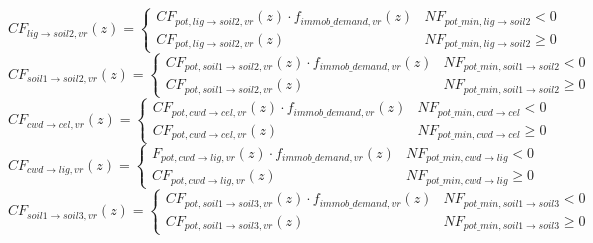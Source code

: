 \begin{equation}
    CF_{lig \rightarrow soil2, vr}(z)=\left\{\begin{array}{ll} CF_{pot, lig \rightarrow soil2, vr}(z) \cdot f_{immob\_demand, vr}(z) & NF_{pot\_{min, lig \rightarrow soil2}} <0 \\ 
    CF_{pot, lig \rightarrow soil2, vr}(z) & NF_{pot\_{min, lig \rightarrow soil2}} \geqslant 0
   \end{array}\right.
\end{equation}
\begin{equation}
    CF_{soil1 \rightarrow soil2, vr}(z)=\left\{\begin{array}{ll} CF_{pot, soil1 \rightarrow soil2, vr}(z) \cdot f_{immob\_demand, vr}(z) & NF_{pot\_{min, soil1 \rightarrow soil2}} <0 \\ 
    CF_{pot, soil1 \rightarrow soil2, vr}(z) & NF_{pot\_{min, soil1 \rightarrow soil2}} \geqslant 0
   \end{array}\right.
\end{equation}
\begin{equation}
    CF_{cwd \rightarrow cel, vr}(z)=\left\{\begin{array}{ll} CF_{pot, cwd \rightarrow cel, vr}(z) \cdot f_{immob\_demand, vr}(z) & NF_{pot\_{min, cwd \rightarrow cel}} <0 \\ 
    CF_{pot, cwd \rightarrow cel, vr}(z) & NF_{pot\_{min, cwd \rightarrow cel}} \geqslant 0
   \end{array}\right.
\end{equation}
\begin{equation}
    CF_{cwd \rightarrow lig, vr}(z)=\left\{\begin{array}{ll} F_{pot, cwd \rightarrow lig, vr}(z) \cdot f_{immob\_demand, vr}(z) & NF_{pot\_{min, cwd \rightarrow lig}} <0 \\ 
    CF_{pot, cwd \rightarrow lig, vr}(z) & NF_{pot\_{min, cwd \rightarrow lig}} \geqslant 0
   \end{array}\right.
\end{equation}
\begin{equation}
    CF_{soil1 \rightarrow soil3, vr}(z)=\left\{\begin{array}{ll} CF_{pot, soil1 \rightarrow soil3, vr}(z) \cdot f_{immob\_demand, vr}(z) & NF_{pot\_{min, soil1 \rightarrow soil3}} <0 \\ 
    CF_{pot, soil1 \rightarrow soil3, vr}(z) & NF_{pot\_{min, soil1 \rightarrow soil3}} \geqslant 0
   \end{array}\right.
\end{equation}
